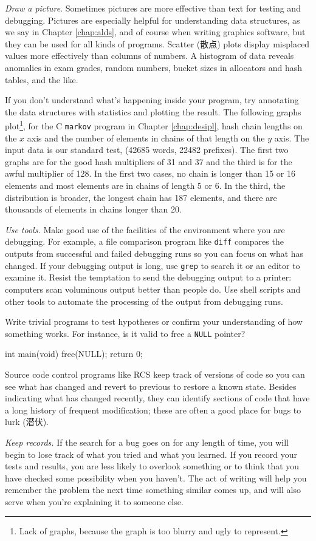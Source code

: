 \emph{Draw a picture}. Sometimes pictures are more effective than text for
testing and debugging. Pictures are especially helpful for understanding
data structures, as we say in Chapter \ref{chap:alds}, and of course when
writing graphics software, but they can be used for all kinds of programs.
Scatter (散点) plots display misplaced values more effectively than columns
of numbers. A histogram of data reveals anomalies in exam grades, random
numbers, bucket sizes in allocators and hash tables, and the like.

If you don't understand what's happening inside your program, try
annotating the data structures with statistics and plotting the result. The
following graphs plot\footnote{Lack of graphs, because the graph is too
blurry and ugly to represent.}, for the C \verb'markov' program in Chapter
\ref{chap:desipl}, hash chain lengths on the $x$ axis and the number of
elements in chains of that length on the $y$ axis. The input data is our
standard test,  (42685 words, 22482
prefixes). The first two graphs are for the good hash multipliers of 31 and
37 and the third is for the awful multiplier of 128. In the first two
cases, no chain is longer than 15 or 16 elements and most elements are in
chains of length 5 or 6. In the third, the distribution is broader, the
longest chain has 187 elements, and there are thousands of elements in
chains longer than 20.

\emph{Use tools.} Make good use of the facilities of the environment where
you are debugging. For example, a file comparison program like \verb'diff'
compares the outputs from successful and failed debugging runs so you can
focus on what has changed. If your debugging output is long, use
\verb'grep' to search it or an editor to examine it. Resist the temptation
to send the debugging output to a printer: computers scan voluminous output
better than people do. Use shell scripts and other tools to automate the
processing of the output from debugging runs.

Write trivial programs to test hypotheses or confirm your understanding of
how something works. For instance, is it valid to free a \verb'NULL' pointer?
\begin{wellcode}
    int main(void)
    {
        free(NULL);
        return 0;
    }
\end{wellcode}

Source code control programs like RCS keep track of versions of code so you
can see what has changed and revert to previous to restore a known state.
Besides indicating what has changed recently, they can identify sections of
code that have a long history of frequent modification; these are often a
good place for bugs to lurk (潜伏).

\emph{Keep records.} If the search for a bug goes on for any length of
time, you will begin to lose track of what you tried and what you learned.
If you record your tests and results, you are less likely to overlook
something or to think that you have checked some possibility when you
haven't. The act of writing will help you remember the problem the next
time something similar comes up, and will also serve when you're explaining
it to someone else.
